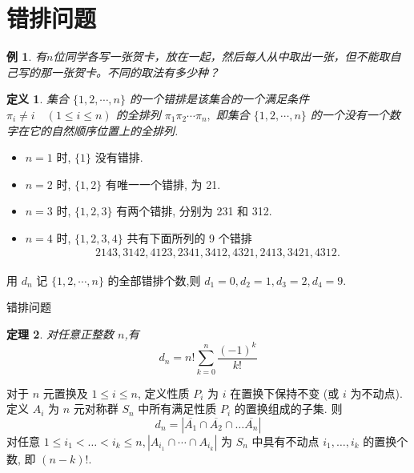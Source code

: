 \documentclass[punct]{ctexbeamer}
\newtheorem{thm}{定理}[]
\newtheorem{defi}[thm]{定义}
\newtheorem{ex}{例}
\def\pf{\noindent {\bf 证明\ }}
\begin{document}
\section{错排问题}
\begin{frame}

       \begin{ex}
        有$n$位同学各写一张贺卡，放在一起，然后每人从中取出一张，但不能取自己写的那一张贺卡。不同的取法有多少种？
    \end{ex}

    \begin{defi}
        集合 $\{1,2, \cdots, n\}$ 的一个\alert{错排}是该集合的一个满足条件
        $
        \pi_{i} \neq i \quad(1 \leqslant i \leqslant n)
        $
        的全排列
        $
        \pi_{1} \pi_{2} \cdots \pi_{n},
        $
        即集合 $\{1,2, \cdots, n\}$ 的一个没有一个数字在它的自然顺序位置上的全排列.
    \end{defi}

    \begin{itemize}
        \item $n=1$ 时, $\{1\}$ 没有错排.
        \item  $n=2$ 时, $\{1,2\}$ 有唯一一个错排, 为 21.
        \pause
        \item $n=3$ 时, $\{1,2,3\}$ 有两个错排, 分别为 231 和 312.
        \item $n=4$ 时, $\{1,2,3,4\}$ 共有下面所列的 9 个错排
        $$
        \begin{array}{l}
            2143,3142,4123,2341,3412,
            4321,2413,3421,4312 .
        \end{array}
        $$
    \end{itemize}
用 $d_{n}$ 记 $\{1,2, \cdots, n\}$ 的全部错排个数,则 $d_{1}=0, d_{2}=1, d_{3}=2, d_{4}=9$.

\end{frame}

\begin{frame}{错排问题}

    \begin{thm}
        对任意正整数 $n$,有
        $$
        d_{n}=  n ! \sum_{k=0}^{n} \frac{(-1)^{k}}{k !}
        $$
    \end{thm}
    \pf
    对于 $n$ 元置换及 $1 \leq i \leq n$, 定义性质 $P_{i}$ 为 $i$ 在置换下保持不变 (或 $i$ 为不动点). 定义 $A_{i}$ 为 $n$ 元对称群 $S_{n}$ 中所有满足性质 $P_{i}$ 的置换组成的子集. 则
    $$
    d_{n}=\left|\overline{A_{1}} \cap \overline{A_{2}} \cap \ldots \overline{A_{n}}\right|
    $$
    对任意 $1 \leq i_{1}<\ldots<i_{k} \leq n,\left|A_{i_{1}} \cap \cdots \cap A_{i_{k}}\right|$ 为 $S_{n}$ 中具有不动点 $i_{1}, \ldots, i_{k}$ 的置换个数, 即
    $(n-k) !$.

%



\end{frame}
\end{document}
